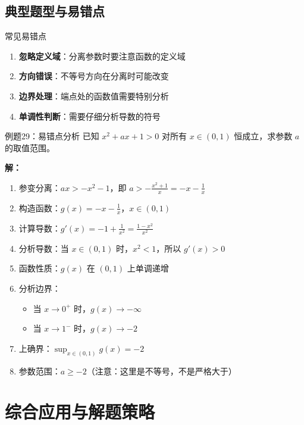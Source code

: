 \documentclass[a4paper,11pt]{ctexart}
\theoremstyle{definition}
\theoremstyle{remark}
\begin{document}
\subsection{典型题型与易错点}

\begin{warningbox}{常见易错点}
\begin{enumerate}
    \item \textbf{忽略定义域}：分离参数时要注意函数的定义域
    \item \textbf{方向错误}：不等号方向在分离时可能改变
    \item \textbf{边界处理}：端点处的函数值需要特别分析
    \item \textbf{单调性判断}：需要仔细分析导数的符号
\end{enumerate}
\end{warningbox}

\begin{examplebox}{例题29：易错点分析}
已知 $x^2 + ax + 1 > 0$ 对所有 $x \in (0,1)$ 恒成立，求参数 $a$ 的取值范围。

\textbf{解：}
\begin{enumerate}
    \item 参变分离：$ax > -x^2 - 1$，即 $a > -\frac{x^2 + 1}{x} = -x - \frac{1}{x}$
    \item 构造函数：$g(x) = -x - \frac{1}{x}$，$x \in (0,1)$
    \item 计算导数：$g'(x) = -1 + \frac{1}{x^2} = \frac{1-x^2}{x^2}$
    \item 分析导数：当 $x \in (0,1)$ 时，$x^2 < 1$，所以 $g'(x) > 0$
    \item 函数性质：$g(x)$ 在 $(0,1)$ 上单调递增
    \item 分析边界：
    \begin{itemize}
        \item 当 $x \to 0^+$ 时，$g(x) \to -\infty$
        \item 当 $x \to 1^-$ 时，$g(x) \to -2$
    \end{itemize}
    \item 上确界：$\sup_{x \in (0,1)} g(x) = -2$
    \item 参数范围：$a \geq -2$（注意：这里是不等号，不是严格大于）
\end{enumerate}
\end{examplebox}

\section{综合应用与解题策略}
\end{document}
